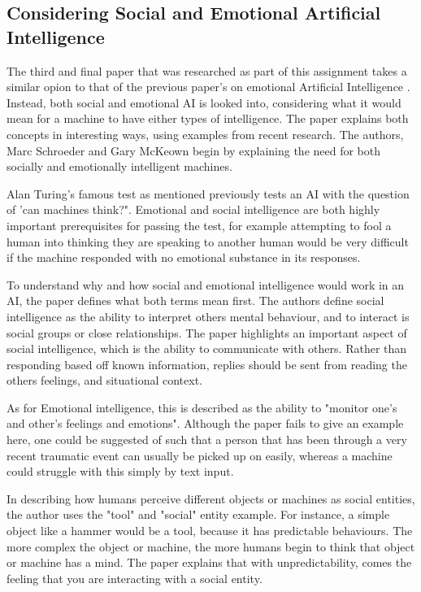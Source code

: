 \documentclass[article]{IEEEtran}
\begin{document}
\subsection{Considering Social and Emotional Artificial Intelligence}
The third and final paper that was researched as part of this assignment takes a similar opion to that of the previous paper's on emotional Artificial Intelligence \cite{ethicsSocial}. Instead, both social and emotional AI is looked into, considering what it would mean for a machine to have either types of intelligence. The paper explains both concepts in interesting ways, using examples from recent research. The authors, Marc Schroeder and Gary McKeown begin by explaining the need for both socially and emotionally intelligent machines. \par
Alan Turing's famous test as mentioned previously tests an AI with the question of 'can machines think?". Emotional and social intelligence are both highly important prerequisites for passing the test, for example attempting to fool a human into thinking they are speaking to another human would be very difficult if the machine responded with no emotional substance in its responses.	\par
To understand why and how social and emotional intelligence would work in an AI, the paper defines what both terms mean first. The authors define social intelligence as the ability to interpret others mental behaviour, and to interact is social groups or close relationships. The paper highlights an important aspect of social intelligence, which is the ability to communicate with others. Rather than responding based off known information, replies should be sent from reading the others feelings, and situational context.\par
As for Emotional intelligence, this is described as the ability to "monitor one's and other's feelings and emotions". Although the paper fails to give an example here, one could be suggested of such that a person that has been through a very recent traumatic event can usually be picked up on easily, whereas a machine could struggle with this simply by text input. \par
In describing how humans perceive different objects or machines as social entities, the author uses the "tool" and "social" entity example. For instance, a simple object like a hammer would be a tool, because it has predictable behaviours. The more complex the object or machine, the more humans begin to think that object or machine has a mind. The paper explains that with unpredictability, comes the feeling that you are interacting with a social entity.\par
\end{document}

